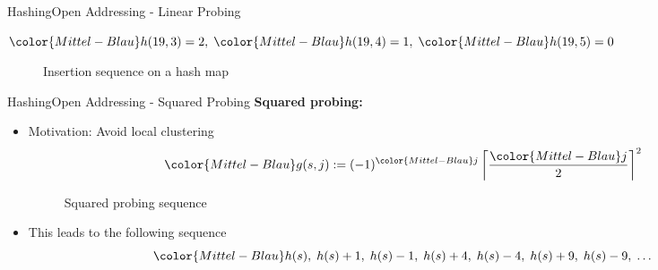 \begin{frame}{Hashing}{Open Addressing - Linear Probing}
\begin{itemize}
\begin{math}
        {\color{Mittel-Blau}h(19, 3)} = 2 ,\;
        {\color{Mittel-Blau}h(19, 4)} = 1 ,\;
        {\color{Mittel-Blau}h(19, 5)} = 0
      \end{math}
      \begin{figure}[!h]
        \def\LPEData{
          {19, {\color{green2}F}}/0,
          {15, {\color{green2}D}}/1,
          {2, {\color{green2}E}}/2,
          {5, {\color{green2}C}}/3,
          {53, {\color{green2}B}}/4,
          {12, {\color{green2}A}}/5,
          \relax/6
        }%
        \def\LPEShowIndex{0}%
        \begin{adjustbox}{width=0.75\linewidth}%
        \end{adjustbox}
        \vspace{-0.5em}%
        \caption{Insertion sequence on a hash map}%
        \label{fig:hashing:open_addressing:linear_probing_example7}%
      \end{figure}
  \end{itemize}
\end{frame}


\begin{frame}{Hashing}{Open Addressing - Squared Probing}
  \textbf{Squared probing:}
  \begin{itemize}
    \item<2->
      Motivation: Avoid local clustering
      \begin{displaymath}
        {\color{Mittel-Blau}g(s,j)}
        := (-1)^{\color{Mittel-Blau}j}
        \left\lceil \frac{{\color{Mittel-Blau}j}}{2} \right\rceil^2
      \end{displaymath}
    \vspace{-2.0em}
  \begin{figure}[!h]
    \begin{adjustbox}{width=0.7\linewidth}%
    \end{adjustbox}
    \vspace{-1.0em}
    \caption{Squared probing sequence}%
    \label{fig:hashing:open_addressing:squared_probing}%
  \end{figure}
    \item<4->
      This leads to the following sequence
      \begin{displaymath}
        {\color{Mittel-Blau}h(s) ,\;
        h(s)+1 ,\;
        h(s)-1 ,\;
        h(s)+4 ,\;
        h(s)-4 ,\;
        h(s)+9 ,\;
        h(s)-9 ,\;}
        \dotsc
      \end{displaymath}
  \end{itemize}
  \vspace{1.0em}
\end{frame}

